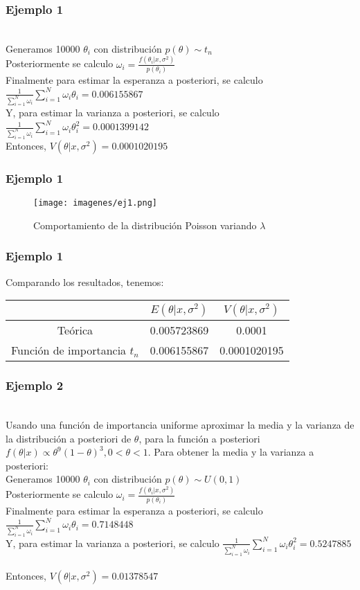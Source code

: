 \documentclass[12pt]{beamer}
\begin{document}
\begin{frame}
\frametitle{Ejemplo 1}
~\\Generamos 10000 $\theta_{i}$ con distribución $p(\theta)\sim t_{n}$
~\\Posteriormente se calculo $\omega_{i}=\frac{f(\theta_{i}|x,\sigma^2)}{p(\theta_{i})}$
~\\Finalmente para estimar la esperanza a posteriori, se calculo $\frac{1}{\sum\limits_{i=1}^{N}\omega_{i}}\sum\limits_{i=1}^{N}\omega_{i}\theta_{i}=0.006155867$
~\\Y, para estimar la varianza a posteriori, se calculo $\frac{1}{\sum\limits_{i=1}^{N}\omega_{i}}\sum\limits_{i=1}^{N}\omega_{i}\theta_{i}^2=0.0001399142$
~\\Entonces, $V(\theta|x,\sigma^2)=0.0001020195$
\end{frame}

\begin{frame}
\frametitle{Ejemplo 1}
\begin{figure}[!h]
    \begin{center}
        \texttt{[image: imagenes/ej1.png]}
        \caption{Comportamiento de la distribución Poisson variando $\lambda$}
        \label{fig:Densidad}
    \end{center}
\end{figure}
\end{frame}

\begin{frame}
\frametitle{Ejemplo 1}
Comparando los resultados, tenemos:
\begin{tabular}{|c|c|c|}
\hline 
 & $E(\theta|x,\sigma^2)$ & $V(\theta|x,\sigma^2)$ \\ 
\hline 
Teórica & 0.005723869 & 0.0001 \\ 
Función de importancia $t_{n}$ &  0.006155867 & 0.0001020195 \\ 
\hline 
\end{tabular} 
\end{frame}

\begin{frame}
\frametitle{Ejemplo 2}
~\\ Usando una función de importancia uniforme aproximar la media y la varianza de la distribución a posteriori de $\theta$, para la función a posteriori $f(\theta|x)\propto \theta^9(1-\theta)^3, 0<\theta<1$. Para obtener la media y la varianza a posteriori:
~\\Generamos 10000 $\theta_{i}$ con distribución $p(\theta)\sim U(0,1)$
~\\Posteriormente se calculo $\omega_{i}=\frac{f(\theta_{i}|x,\sigma^2)}{p(\theta_{i})}$
~\\Finalmente para estimar la esperanza a posteriori, se calculo $\frac{1}{\sum\limits_{i=1}^{N}\omega_{i}}\sum\limits_{i=1}^{N}\omega_{i}\theta_{i}=0.7148448$
~\\Y, para estimar la varianza a posteriori, se calculo $\frac{1}{\sum\limits_{i=1}^{N}\omega_{i}}\sum\limits_{i=1}^{N}\omega_{i}\theta_{i}^2=0.5247885$
~\\Entonces, $V(\theta|x,\sigma^2)=0.01378547$
\end{frame}
\end{document}

